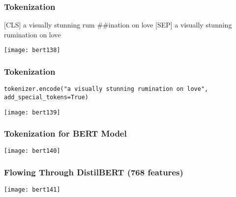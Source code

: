 \begin{frame}[fragile]\frametitle{ Tokenization}

[CLS] a visually stunning rum \#\#ination on love [SEP]
a visually stunning rumination on love


			\begin{center}
			\texttt{[image: bert138]}
			\end{center}	


\end{frame}

\begin{frame}[fragile]\frametitle{ Tokenization}

\lstinline|tokenizer.encode("a visually stunning rumination on love", add_special_tokens=True)|


			\begin{center}
			\texttt{[image: bert139]}
			\end{center}	


\end{frame}

\begin{frame}[fragile]\frametitle{ Tokenization for BERT Model}

			\begin{center}
			\texttt{[image: bert140]}
			\end{center}	


\end{frame}

\begin{frame}[fragile]\frametitle{ Flowing Through DistilBERT (768 features)}

			\begin{center}
			\texttt{[image: bert141]}
			\end{center}	


\end{frame}

